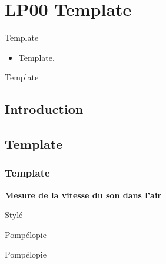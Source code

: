 \section{LP00 Template}

\niveau Template

\prerequis
\begin{itemize}
\item Template.
\end{itemize}

\objectif Template

\footnotesize{}

\subsection{Introduction}

\subsection{Template}

\subsubsection{Template}

\begin{experience}
\textbf{Mesure de la vitesse du son dans l'air}
\end{experience}
\begin{slide}
Stylé
\end{slide}
\begin{transition}
Pompélopie
\end{transition}
\begin{remarque}
Pompélopie
\end{remarque}

\newpage
